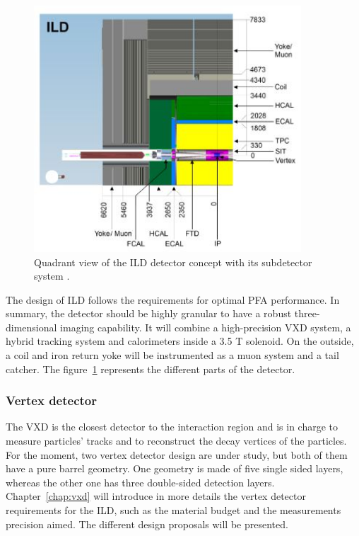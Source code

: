     \begin{figure}[!h]
      \centering
      \includegraphics[width = 10cm]{Pictures/ILC/fig_ILD_Quadrant.png}
      \caption{Quadrant view of the ILD detector concept with its subdetector system \cite{Behnke2010}.}
      \label{fig:ILD_quadrant}
    \end{figure}

    The design of \gls{ILD} follows the requirements for optimal \gls{PFA} performance.
    In summary, the detector should be highly granular to have a robust three-dimensional imaging capability.
    It will combine a high-precision \acrfull{VXD} system, a hybrid tracking system and calorimeters inside a 3.5 T solenoid. 
    On the outside, a coil and iron return yoke will be instrumented as a muon system and a tail catcher.
    The figure~\ref{fig:ILD_quadrant} represents the different parts of the detector.

      \subsubsection{Vertex detector}

      The \gls{VXD} is the closest detector to the interaction region and is in charge to measure particles' tracks and to reconstruct the decay vertices of the particles.
      For the moment, two vertex detector design are under study, but both of them have a pure barrel geometry.
      One geometry is made of five single sided layers, whereas the other one has three double-sided detection layers.
      Chapter~\ref{chap:vxd} will introduce in more details the vertex detector requirements for the \gls{ILD}, such as the material budget and the measurements precision aimed.
      The different design proposals will be presented. 

